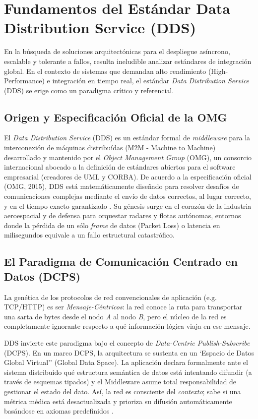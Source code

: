 \documentclass[11pt,a4paper,oneside]{report}
\begin{document}
\section{Fundamentos del Est\'andar Data Distribution Service (DDS)}

En la b\'usqueda de soluciones arquitect\'onicas para el despliegue as\'incrono, escalable y tolerante a fallos, resulta ineludible analizar est\'andares de integraci\'on global. En el contexto de sistemas que demandan alto rendimiento (High-Performance) e integraci\'on en tiempo real, el est\'andar \textit{Data Distribution Service} (DDS) se erige como un paradigma cr\'itico y referencial.

\subsection{Origen y Especificaci\'on Oficial de la OMG}
El \textit{Data Distribution Service} (DDS) es un est\'andar formal de \textit{middleware} para la interconexi\'on de m\'aquinas distribu\'idas (M2M - Machine to Machine) desarrollado y mantenido por el \textit{Object Management Group} (OMG), un consorcio internacional abocado a la definici\'on de est\'andares abiertos para el software empresarial (creadores de UML y CORBA). De acuerdo a la especificaci\'on oficial (OMG, 2015), DDS est\'a matem\'aticamente dise\~nado para resolver desaf\'ios de comunicaciones complejas mediante el env\'io de datos correctos, al lugar correcto, y en el tiempo exacto garantizado \citep{omg2015}. Su g\'enesis surge en el coraz\'on de la industria aeroespacial y de defensa para orquestar radares y flotas aut\'onomas, entornos donde la p\'erdida de un s\'olo \textit{frame} de datos (Packet Loss) o latencia en milisegundos equivale a un fallo estructural catastr\'ofico.

\subsection{El Paradigma de Comunicaci\'on Centrado en Datos (DCPS)}
La gen\'etica de los protocolos de red convencionales de aplicaci\'on (e.g. TCP/HTTP) es ser \textit{Mensaje-C\'entricos}: la red conoce la ruta para transportar una sarta de bytes desde el nodo \textit{A} al nodo \textit{B}, pero el n\'ucleo de la red es completamente ignorante respecto a qu\'e informaci\'on l\'ogica viaja en ese mensaje. 

DDS invierte este paradigma bajo el concepto de \textit{Data-Centric Publish-Subscribe} (DCPS). En un marco DCPS, la arquitectura se sustenta en un `Espacio de Datos Global Virtual'' (Global Data Space). La aplicaci\'on declara formalmente ante el sistema distribuido qu\'e estructura sem\'antica de datos est\'a intentando difundir (a trav\'es de esquemas tipados) y el Middleware asume total responsabilidad de gestionar el estado del dato. As\'i, la red es consciente del \textit{contexto}; sabe si una m\'etrica m\'edica est\'a desactualizada y prioriza su difusi\'on autom\'aticamente bas\'andose en axiomas predefinidos \citep{corsaro2006}.
\end{document}
